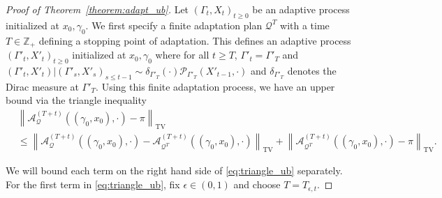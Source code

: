 \documentclass[12pt]{article}
\theoremstyle{plain}
\theoremstyle{remark}
\newcommand{\norm}[1]{\left\lVert#1\right\rVert}
\newcommand{\e}{\epsilon}
\newcommand{\Z}{\mathbb{Z}}
\newcommand{\Q}{\mathcal{Q}}
\renewcommand{\P}{\mathcal{P}}
\newcommand{\A}{\mathcal{A}}
\begin{document}
\begin{proof}[Proof of Theorem~\ref{theorem:adapt_ub}]
Let $(\Gamma_t, X_t)_{t \ge 0}$ be an adaptive process initialized at $x_0, \gamma_0$.
We first specify a finite adaptation plan $\Q^{T}$ with a time $T \in \Z_+$ defining a stopping point of adaptation.
This defines an adaptive process $(\Gamma'_t, X'_t)_{t \ge 0}$ initialized at $x_0, \gamma_0$ where for all $t \ge T$, $\Gamma'_t = \Gamma'_{T}$ and $(\Gamma'_t, X'_t) | (\Gamma'_s, X'_s)_{s \le t-1} \sim \delta_{\Gamma'_{T}}(\cdot) \P_{\Gamma'_{T}}(X'_{t-1}, \cdot)$ and $\delta_{\Gamma'_{T}}$ denotes the Dirac measure at $\Gamma'_{T}$.
Using this finite adaptation process, we have an upper bound via the triangle inequality
\begin{align}
&\norm{ \A_{\Q}^{(T + t)}((\gamma_0, x_0), \cdot) - \pi }_{\text{TV}} \nonumber
\\
&\le \norm{ \A_{\Q}^{(T + t)}((\gamma_0, x_0), \cdot) - \A_{\Q^T}^{(T + t)}((\gamma_0, x_0), \cdot) }_{\text{TV}}
+ \norm{ \A_{\Q^{T}}^{(T + t)}((\gamma_0, x_0), \cdot) - \pi }_{\text{TV}}.
\label{eq:triangle_ub}
\end{align}

We will bound each term on the right hand side of \eqref{eq:triangle_ub} separately.
For the first term in \eqref{eq:triangle_ub}, fix $\e \in (0, 1)$ and choose $T = T_{\e, t}$.



\end{proof}
\end{document}
